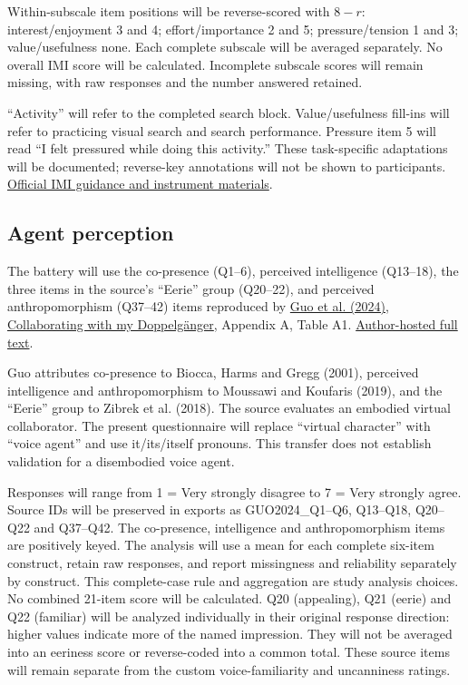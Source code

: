 \documentclass[11pt,letterpaper]{article}
\begin{document}
Within-subscale item positions will be reverse-scored with $8-r$: interest/enjoyment 3 and 4; effort/importance 2 and 5; pressure/tension 1 and 3; value/usefulness none. Each complete subscale will be averaged separately. No overall IMI score will be calculated. Incomplete subscale scores will remain missing, with raw responses and the number answered retained.

``Activity'' will refer to the completed search block. Value/usefulness fill-ins will refer to practicing visual search and search performance. Pressure item 5 will read ``I felt pressured while doing this activity.'' These task-specific adaptations will be documented; reverse-key annotations will not be shown to participants.
\href{https://selfdeterminationtheory.org/intrinsic-motivation-inventory/}{Official IMI guidance and instrument materials}.

\subsection{Agent perception}
The battery will use the co-presence (Q1--6), perceived intelligence (Q13--18), the three items in the source's ``Eerie'' group (Q20--22), and perceived anthropomorphism (Q37--42) items reproduced by \href{https://doi.org/10.1145/3651288}{Guo et al. (2024), Collaborating with my Doppelg\"anger}, Appendix A, Table A1. \href{https://web.ics.purdue.edu/~cmousas/papers/jour24-PACMCGIT-SelfSimiarAppearanceVoice.pdf}{Author-hosted full text}.

Guo attributes co-presence to Biocca, Harms and Gregg (2001), perceived intelligence and anthropomorphism to Moussawi and Koufaris (2019), and the ``Eerie'' group to Zibrek et al. (2018). The source evaluates an embodied virtual collaborator. The present questionnaire will replace ``virtual character'' with ``voice agent'' and use it/its/itself pronouns. This transfer does not establish validation for a disembodied voice agent.

Responses will range from 1 = Very strongly disagree to 7 = Very strongly agree. Source IDs will be preserved in exports as GUO2024\_Q1--Q6, Q13--Q18, Q20--Q22 and Q37--Q42. The co-presence, intelligence and anthropomorphism items are positively keyed. The analysis will use a mean for each complete six-item construct, retain raw responses, and report missingness and reliability separately by construct. This complete-case rule and aggregation are study analysis choices. No combined 21-item score will be calculated. Q20 (appealing), Q21 (eerie) and Q22 (familiar) will be analyzed individually in their original response direction: higher values indicate more of the named impression. They will not be averaged into an eeriness score or reverse-coded into a common total. These source items will remain separate from the custom voice-familiarity and uncanniness ratings.
\end{document}
